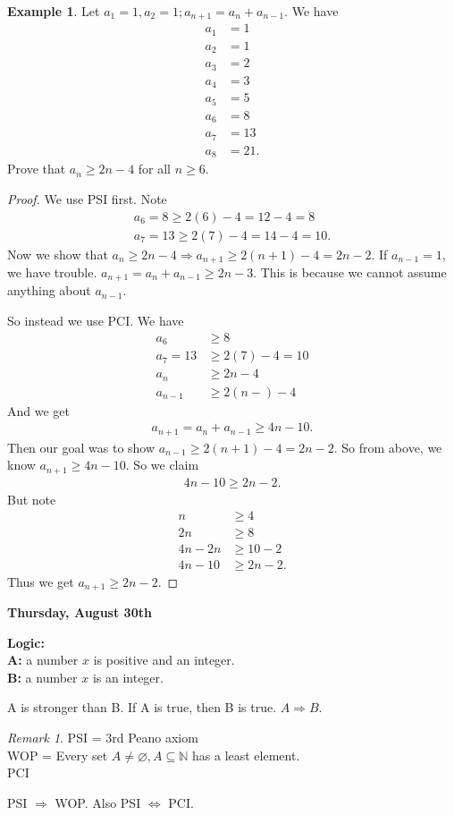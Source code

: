 \documentclass[12pt]{amsbook}
\let\emptyset\varnothing
\theoremstyle{plain}
\numberwithin{section}{chapter}
\numberwithin{equation}{chapter}
\theoremstyle{definition}
\newtheorem{Ex}[theorem]{Example}
\theoremstyle{remark}
\newtheorem{rem}[theorem]{Remark}
\theoremstyle{plain}
\newcommand{\sub}{\subseteq}
\newcommand{\n}{\mathbb{N}}
\newcommand{\bee}{\begin{equation}\begin{aligned}}
\newcommand{\eee}{\end{aligned}\end{equation}}
\renewcommand{\geq}{\geqslant}
\begin{document}
\begin{Ex}
Let $a_1 = 1,a_2 = 1;a_{n + 1} = a_n + a_{n - 1}$. We have
\bee
a_1 &= 1\\
a_2 &= 1\\
a_3 &= 2\\
a_4 &= 3\\
a_5 &= 5\\
a_6 &= 8\\
a_7 &= 13\\
a_8 &= 21.
\eee
Prove that $a_n \geq 2n - 4$ for all $n \geq 6$. 
\end{Ex}

\begin{proof}
We use PSI first. Note 
\bee
a_6 = 8 \geq 2(6) - 4 = 12 - 4 = 8\\
a_7 = 13 \geq 2(7) - 4 = 14 - 4 = 10. 
\eee
Now we show that $a_n \geq 2n - 4 \Rightarrow a_{n + 1} \geq 2(n + 1) - 4 = 2n  -2$. If $a_{n - 1} = 1$, we have trouble. $a_{n + 1} = a_n + a_{n - 1} \geq 2n  -3$. This is because we cannot assume anything about $a_{n - 1}$. 

So instead we use PCI. We have
\bee
a_6 &\geq 8\\
a_7 = 13 &\geq 2(7) - 4 = 10\\
a_n &\geq 2n - 4\\
a_{n - 1} &\geq 2(n - ) - 4
\eee
And we get
\bee
a_{n + 1} = a_n + a_{n - 1} \geq 4n - 10. 
\eee
Then our goal was to show $a_{n - 1} \geq 2(n + 1) - 4 = 2n - 2$. So from above, we know $a_{n + 1} \geq 4n  - 10$. So we claim
\bee
4n - 10 \geq 2n - 2.
\eee
But note
\bee
n &\geq 4\\
2n &\geq 8\\
4n - 2n &\geq 10 - 2\\
4n - 10 &\geq 2n - 2.
\eee
Thus we get $a_{n +1 } \geq 2n - 2$. 
\end{proof}


\textbf{Thursday, August 30th}

\textbf{Logic:}\\
\textbf{A: }a number $x$ is positive and an integer. \\
\textbf{B: }a number $x$ is an integer. 

A is stronger than B. If A is true, then B is true. $A \Rightarrow B$. 

\begin{rem}
PSI = 3rd Peano axiom\\
WOP = Every set $A \neq \emptyset, A \sub \n$ has a least element. \\
PCI

PSI $\Rightarrow$ WOP. Also PSI $\Leftrightarrow$ PCI.
\end{rem}
\end{document}

